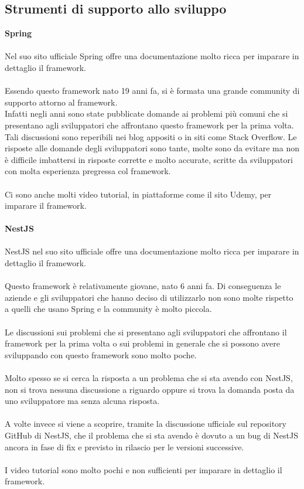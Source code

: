\subsection{Strumenti di supporto allo sviluppo}
\textbf{Spring}
\\\\
Nel suo sito ufficiale Spring offre una documentazione molto ricca per imparare in dettaglio il framework.
\\\\
Essendo questo framework nato 19 anni fa, si è formata una grande community di supporto attorno al framework. 
\\
Infatti negli anni sono state pubblicate domande ai problemi più comuni che si presentano agli sviluppatori
che affrontano questo framework per la prima volta. 
\\
Tali discussioni sono reperibili nei blog appositi o in siti come Stack Overflow. Le risposte alle domande
degli sviluppatori sono tante, molte sono da evitare ma non è difficile imbattersi in risposte
corrette e molto accurate, scritte da sviluppatori con molta esperienza pregressa col framework.
\\\\
Ci sono anche molti video tutorial, in piattaforme come il sito Udemy, per imparare il framework.
\\\\
\textbf{NestJS}
\\\\
NestJS nel suo sito ufficiale offre una documentazione molto ricca per imparare in dettaglio il framework.
\\\\
Questo framework è relativamente giovane, nato 6 anni fa. Di conseguenza le aziende e gli sviluppatori che hanno
deciso di utilizzarlo non sono molte rispetto a quelli che usano Spring e la community è molto piccola.
\\\\
Le discussioni sui problemi che si presentano agli sviluppatori che affrontano il framework per la prima volta
o sui problemi in generale che si possono avere sviluppando con questo framework sono molto poche. 
\\\\
Molto spesso se si cerca la risposta a un problema che si sta avendo con NestJS, non si trova nessuna discussione
a riguardo oppure si trova la domanda posta da uno sviluppatore ma senza alcuna risposta.
\\\\
A volte invece si viene a scoprire, tramite la discussione ufficiale sul repository GitHub di NestJS, che il 
problema che si sta avendo è dovuto a un bug di NestJS ancora in fase di fix e previsto in rilascio per le versioni
successive.
\\\\
I video tutorial sono molto pochi e non sufficienti per imparare in dettaglio il framework.

